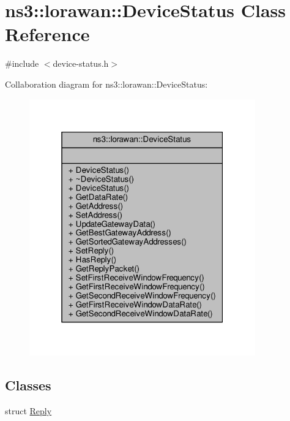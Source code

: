 \hypertarget{classns3_1_1lorawan_1_1DeviceStatus}{}\section{ns3\+:\+:lorawan\+:\+:Device\+Status Class Reference}
\label{classns3_1_1lorawan_1_1DeviceStatus}


{\ttfamily \#include $<$device-\/status.\+h$>$}



Collaboration diagram for ns3\+:\+:lorawan\+:\+:Device\+Status\+:
\nopagebreak
\begin{figure}[H]
\begin{center}
\leavevmode
\includegraphics[width=277pt]{classns3_1_1lorawan_1_1DeviceStatus__coll__graph}
\end{center}
\end{figure}
\subsection*{Classes}
\begin{DoxyCompactItemize}
\item 
struct \hyperlink{structns3_1_1lorawan_1_1DeviceStatus_1_1Reply}{Reply}
\end{DoxyCompactItemize}
